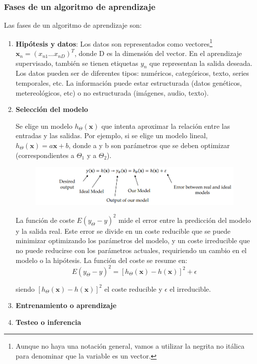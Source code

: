 \subsubsection{Fases de un algoritmo de aprendizaje}
Las fases de un algoritmo de aprendizaje son:
\begin{enumerate}
\item \textbf{Hipótesis y datos}: Los datos son representados como vectores\footnote{Aunque no haya una notación general, vamos a utilizar la negrita no itálica para denominar que la variable es un vector. }  $\mathrm{\textbf{x}}_n = (x_{n1} ... x_{nD})^T$, donde D es la dimensión del vector. En el aprendizaje supervisado, también se tienen etiquetas $y_n$ que representan la salida deseada. Los datos pueden ser de diferentes tipos: numéricos, categóricos, texto, series temporales, etc. La información puede estar estructurada (datos genéticos, metereológicos, etc) o no estructurada (imágenes, audio, texto).

\item \textbf{Selección del modelo}

Se elige un modelo $h_{\Theta}(\mathrm{\textbf{x}})$ que intenta aproximar la relación entre las entradas y las salidas. Por ejemplo, si se elige un modelo lineal, $h_{\Theta}(\mathrm{\textbf{x}}) = a\mathrm{\textbf{x}} + b$, donde a y b son parámetros que se deben optimizar (correspondientes a $\Theta_1$ y a $\Theta_2$). 

\begin{figure}[h]
\centering
\includegraphics[width = \textwidth]{figs/model-htheta.png}
\end{figure}

La función de coste $E(y_{\Theta} - y )^2$ mide el error entre la predicción del modelo y la salida real. Este error se divide en un coste reducible que se puede minimizar optimizando los parámetros del modelo, y un coste irreducible que no puede reducirse con los parámetros actuales, requiriendo un cambio en el modelo o la hipótesis. La función del coste se resume en:
$$E(y_{\Theta} - y)^2 = [h_{\Theta}(\mathrm{\textbf{x}}) - h(\mathrm{\textbf{x}})]^2 + \epsilon$$

siendo $ [h_{\Theta}(\mathrm{\textbf{x}}) - h(\mathrm{\textbf{x}})]^2$ el coste reducible y $\epsilon$ el irreducible. 

\item \textbf{Entrenamiento o aprendizaje}
\item \textbf{Testeo o inferencia}
\end{enumerate}


